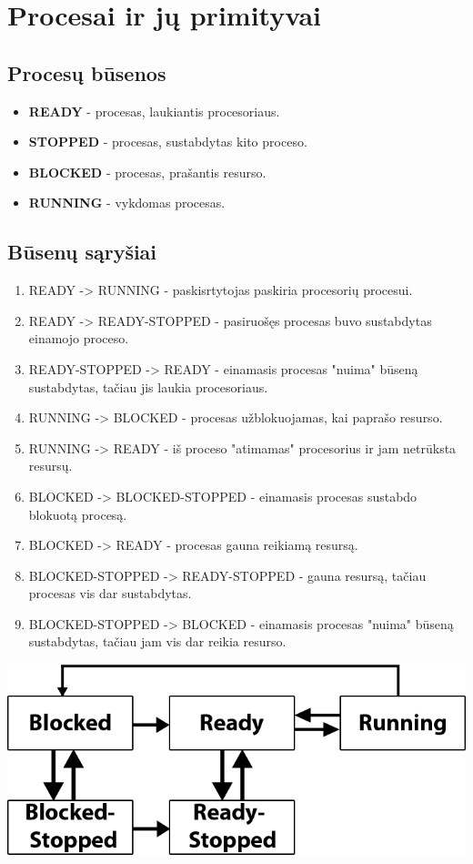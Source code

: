 \section{Procesai ir jų primityvai}
	\subsection{Procesų būsenos}
		\begin{itemize}
			\item \textbf{READY} - procesas, laukiantis procesoriaus.
			\item \textbf{STOPPED} - procesas, sustabdytas kito proceso. 
			\item \textbf{BLOCKED} - procesas, prašantis resurso.
			\item \textbf{RUNNING} - vykdomas procesas.
		\end{itemize}
	\subsection{Būsenų sąryšiai}
		\begin{enumerate}
			\item READY -> RUNNING - paskisrtytojas paskiria procesorių procesui.
			\item READY ->  READY-STOPPED - pasiruošęs procesas buvo sustabdytas einamojo proceso.
			\item READY-STOPPED -> READY - einamasis procesas "nuima" būseną sustabdytas, tačiau jis laukia procesoriaus.
			\item RUNNING -> BLOCKED - procesas užblokuojamas, kai paprašo resurso.
			\item RUNNING -> READY - iš proceso "atimamas" procesorius ir jam netrūksta resursų.
			\item BLOCKED -> BLOCKED-STOPPED - einamasis procesas sustabdo blokuotą procesą.
			\item BLOCKED -> READY - procesas gauna reikiamą resursą.
			\item BLOCKED-STOPPED -> READY-STOPPED - gauna resursą, tačiau procesas vis dar sustabdytas.
			\item BLOCKED-STOPPED -> BLOCKED - einamasis procesas "nuima" būseną sustabdytas, tačiau jam vis dar reikia resurso.
		\end{enumerate}
		\includegraphics[scale=0.75]{ProcessState.png}
